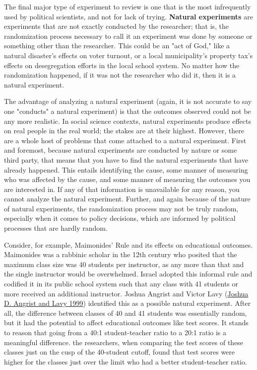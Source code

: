 \documentclass{book}
\begin{document}
The final major type of experiment to review is one that is the most
infrequently used by political scientists, and not for lack of trying.
\textbf{Natural experiments} are experiments that are not exactly conducted by
the researcher; that is, the randomization process necessary to call it an
experiment was done by someone or something other than the researcher. This
could be an "act of God," like a natural disaster's effects on voter turnout,
or a local municipality's property tax's effects on desegregation efforts in
the local school system. No matter how the randomization happened, if it was
not the researcher who did it, then it is a natural experiment.

The advantage of analyzing a natural experiment (again, it is not accurate to
say one "conducts" a natural experiment) is that the outcomes observed could
not be any more realistic. In social science contexts, natural experiments
produce effects on real people in the real world; the stakes are at their
highest. However, there are a whole host of problems that come attached to a
natural experiment. First and foremost, because natural experiments are
conducted by nature or some third party, that means that you have to find the
natural experiments that have already happened. This entails identifying the
cause, some manner of measuring who was affected by the cause, and some manner
of measuring the outcomes you are interested in. If any of that information is
unavailable for any reason, you cannot analyze the natural experiment.
Further, and again because of the nature of natural experiments, the
randomization process may not be truly random, especially when it comes to
policy decisions, which are informed by political processes that are hardly
random.

Consider, for example, Maimonides' Rule and its effects on educational
outcomes. Maimonides was a rabbinic scholar in the 12th century who posited
that the maximum class size was 40 students per instructor, as any more than
that and the single instructor would be overwhelmed. Israel adopted this
informal rule and codified it in its public school system such that any class
with 41 students or more received an additional instructor. Joshua Angrist and
Victor Lavy (\protect\hyperlink{ref-angrist_using_1999}{Joshua D. Angrist and
Lavy 1999}) identified this as a possible natural experiment. After all, the
difference between classes of 40 and 41 students was essentially random, but
it had the potential to affect educational outcomes like test scores. It
stands to reason that going from a 40:1 student-teacher ratio to a 20:1 ratio
is a meaningful difference. the researchers, when comparing the test scores of
these classes just on the cusp of the 40-student cutoff, found that test
scores were higher for the classes just over the limit who had a better
student-teacher ratio.
\end{document}
